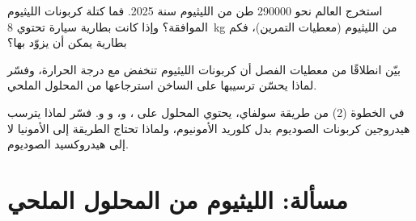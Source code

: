 \begin{exercise}[$\star\star\star$]\label{exo:b1:s-block:10}
استخرج العالم نحو \num{290000} طن من الليثيوم سنة 2025. فما كتلة
كربونات الليثيوم الموافقة؟ وإذا كانت بطارية سيارة تحتوي \qty{8}{kg} من
الليثيوم (معطيات التمرين)، فكم بطارية يمكن أن يزوّد بها؟
\end{exercise}

\begin{exercise}[$\star\star\star$]\label{exo:b1:s-block:11}
بيّن انطلاقًا من معطيات الفصل أن  كربونات الليثيوم تنخفض مع درجة الحرارة،
وفسّر لماذا يحسّن ترسيبها على الساخن
استرجاعها من المحلول الملحي.
\end{exercise}

\begin{exercise}[$\star\star\star$]\label{exo:b1:s-block:12}
في الخطوة (2) من طريقة سولفاي، يحتوي المحلول على ،
و، و و. فسّر لماذا يترسب هيدروجين كربونات الصوديوم
بدل كلوريد الأمونيوم، ولماذا تحتاج الطريقة إلى
الأمونيا لا إلى هيدروكسيد الصوديوم.
\end{exercise}

\section{مسألة: الليثيوم من المحلول الملحي}

